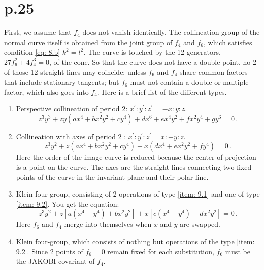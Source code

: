 \documentclass[leqno]{article}
\begin{document}
\section{p.25}
First, we assume that $f_4$ does not vanish identically. The collineation group of the normal curve itself is obtained from the joint group of $f_4$ and $f_6$, which satisfies condition \eqref{eq: 8.b} $k^2=l^2$. The curve is touched by the 12 generators, $27 f_6^2 + 4 f_4^3=0$, of the cone. So that the curve does not have a double point, no 2 of those 12 straight lines may coincide; unless $f_6$ and $f_4$ share common factors that include stationary tangents; but $f_6$ must not contain a double or multiple factor, which also goes into $f_4$. Here is a brief list of the different types. 
\begin{enumerate}[label=\arabic*)]
    \item \label{item: 9.1}Perspective collineation of period 2: $x^\prime : y^\prime : z^\prime = -x : y : z$.
    \begin{equation}\label{eq: 9.1}
        z^3 y^3 + zy (ax^4 + b x^2 y^2 + c y^4) + dx^6 + e x^4 y^2 + f x^2 y^4 + g y^6 = 0 \, . \tag{1}
    \end{equation}
    \item \label{item: 9.2}Collineation \guillemotright with axes \guillemotright of period 2 : $x^\prime : y^\prime : z^\prime = x : -y : z$.
    \begin{equation}\label{eq: 9.2}
        z^3 y^2 + z(ax^4 + b x^2 y^2 + c y^4) + x(dx^4 + e x^2 y^2 + f y^4) = 0 \, . \tag{2}
    \end{equation}
    Here the order of the image curve is reduced because the center of projection is a point on the curve. The axes are the straight lines connecting two fixed points of the curve in the invariant plane and their polar line.
    \item \label{item: 9.3}Klein four-group, consisting of 2 operations of type \ref{item: 9.1} and one of type \ref{item: 9.2}. You get the equation: 
    \begin{equation}\label{eq: 9.3}
        z^3 y^2 + z[a(x^4 + y^4) + b x^2 y^2] + x[c(x^4 + y^4) + d x^2 y^2] = 0 \, . \tag{3}
    \end{equation}
    Here $f_6$ and $f_4$ merge into themselves when $x$ and $y$ are swapped.
    \item \label{item: 9.4}Klein four-group, which consists of nothing but operations of the type \ref{item: 9.2}. Since 2 points of $f_6=0$ remain fixed for each substitution, $f_6$ must be the JAKOBI covariant of $f_4$.

\end{enumerate}
\end{document}
